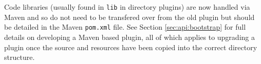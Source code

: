 Code libraries (usually found in \verb!lib! in directory plugins) are now handled via Maven
and so do not need to be transfered over from the old plugin but should be detailed in
the Maven \verb!pom.xml! file. See Section \ref{sec:api:bootstrap} for full details
on developing a Maven based plugin, all of which applies to upgrading a plugin once
the source and resources have been copied into the correct directory structure.

